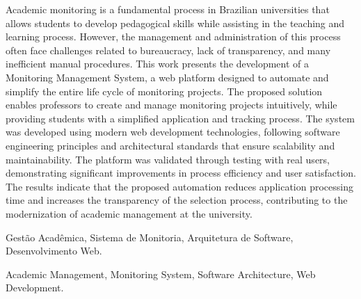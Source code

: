\documentclass[portuguese]{sbc2025}%
\begin{document}
\begin{frontmatter}
\begin{abstract-en}
Academic monitoring is a fundamental process in Brazilian universities that allows students to develop pedagogical skills while assisting in the teaching and learning process. However, the management and administration of this process often face challenges related to bureaucracy, lack of transparency, and many inefficient manual procedures. This work presents the development of a Monitoring Management System, a web platform designed to automate and simplify the entire life cycle of monitoring projects. The proposed solution enables professors to create and manage monitoring projects intuitively, while providing students with a simplified application and tracking process. The system was developed using modern web development technologies, following software engineering principles and architectural standards that ensure scalability and maintainability. The platform was validated through testing with real users, demonstrating significant improvements in process efficiency and user satisfaction. The results indicate that the proposed automation reduces application processing time and increases the transparency of the selection process, contributing to the modernization of academic management at the university.
\end{abstract-en}

\begin{pchaves}
Gestão Acadêmica, Sistema de Monitoria, Arquitetura de Software, Desenvolvimento Web.
\end{pchaves}

\begin{keywords}
Academic Management, Monitoring System, Software Architecture, Web Development.
\end{keywords}

\begin{dates}
\end{dates}



\end{frontmatter}
\end{document}
